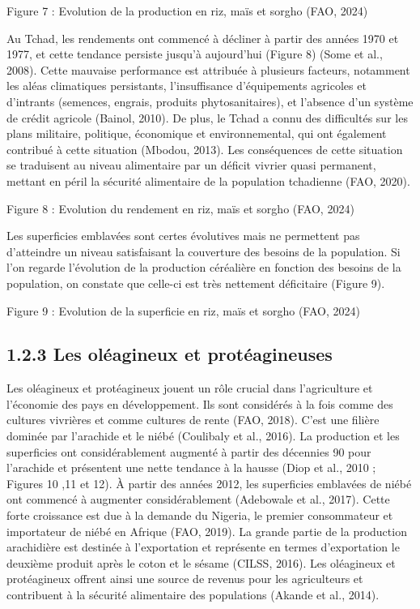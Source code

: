 \documentclass[12pt,oneside]{report}
\begin{document}
Figure 7 : Evolution de la production en riz, maïs et sorgho (FAO, 2024)

Au Tchad, les rendements ont commencé à décliner à partir des années 1970 et 1977, et cette tendance persiste jusqu'à aujourd'hui (Figure 8) (Some et al., 2008). Cette mauvaise performance est attribuée à plusieurs facteurs, notamment les aléas climatiques persistants, l'insuffisance d'équipements agricoles et d'intrants (semences, engrais, produits phytosanitaires), et l'absence d'un système de crédit agricole (Bainol, 2010). De plus, le Tchad a connu des difficultés sur les plans militaire, politique, économique et environnemental, qui ont également contribué à cette situation (Mbodou, 2013). Les conséquences de cette situation se traduisent au niveau alimentaire par un déficit vivrier quasi permanent, mettant en péril la sécurité alimentaire de la population tchadienne (FAO, 2020).

Figure 8 : Evolution du rendement en riz, maïs et sorgho (FAO, 2024)

Les superficies emblavées sont certes évolutives mais ne permettent pas d’atteindre un niveau satisfaisant la couverture des besoins de la population. Si l’on regarde l’évolution de la production céréalière en fonction des besoins de la population, on constate que celle-ci est très nettement déficitaire (Figure 9).

Figure 9 : Evolution de la superficie en riz, maïs et sorgho (FAO, 2024)

\subsection{1.2.3 Les oléagineux et protéagineuses}
Les oléagineux et protéagineux jouent un rôle crucial dans l'agriculture et l'économie des pays en développement. Ils sont considérés à la fois comme des cultures vivrières et comme cultures de rente (FAO, 2018). C’est une filière dominée par l’arachide et le niébé (Coulibaly et al., 2016). La production et les superficies ont considérablement augmenté à partir des décennies 90 pour l’arachide et présentent une nette tendance à la hausse (Diop et al., 2010 ; Figures 10 ,11 et 12). À partir des années 2012, les superficies emblavées de niébé ont commencé à augmenter considérablement (Adebowale et al., 2017). Cette forte croissance est due à la demande du Nigeria, le premier consommateur et importateur de niébé en Afrique (FAO, 2019). La grande partie de la production arachidière est destinée à l’exportation et représente en termes d’exportation le deuxième produit après le coton et le sésame (CILSS, 2016). Les oléagineux et protéagineux offrent ainsi une source de revenus pour les agriculteurs et contribuent à la sécurité alimentaire des populations (Akande et al., 2014).
\end{document}
